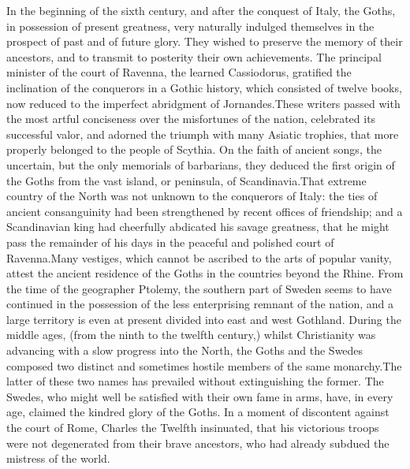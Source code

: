 In the beginning of the sixth century, and after the conquest of
Italy, the Goths, in possession of present greatness, very
naturally indulged themselves in the prospect of past and of
future glory. They wished to preserve the memory of their
ancestors, and to transmit to posterity their own achievements.
The principal minister of the court of Ravenna, the learned
Cassiodorus, gratified the inclination of the conquerors in a
Gothic history, which consisted of twelve books, now reduced to
the imperfect abridgment of Jornandes.\footnotemark[4] These writers passed
with the most artful conciseness over the misfortunes of the
nation, celebrated its successful valor, and adorned the triumph
with many Asiatic trophies, that more properly belonged to the
people of Scythia. On the faith of ancient songs, the uncertain,
but the only memorials of barbarians, they deduced the first
origin of the Goths from the vast island, or peninsula, of
Scandinavia.\footnotemark[5] \footnotemark[501] That extreme country of the North was not
unknown to the conquerors of Italy: the ties of ancient
consanguinity had been strengthened by recent offices of
friendship; and a Scandinavian king had cheerfully abdicated his
savage greatness, that he might pass the remainder of his days in
the peaceful and polished court of Ravenna.\footnotemark[6] Many vestiges,
which cannot be ascribed to the arts of popular vanity, attest
the ancient residence of the Goths in the countries beyond the
Rhine. From the time of the geographer Ptolemy, the southern part
of Sweden seems to have continued in the possession of the less
enterprising remnant of the nation, and a large territory is even
at present divided into east and west Gothland. During the middle
ages, (from the ninth to the twelfth century,) whilst
Christianity was advancing with a slow progress into the North,
the Goths and the Swedes composed two distinct and sometimes
hostile members of the same monarchy.\footnotemark[7] The latter of these two
names has prevailed without extinguishing the former. The Swedes,
who might well be satisfied with their own fame in arms, have, in
every age, claimed the kindred glory of the Goths. In a moment of
discontent against the court of Rome, Charles the Twelfth
insinuated, that his victorious troops were not degenerated from
their brave ancestors, who had already subdued the mistress of
the world.\footnotemark[8]


